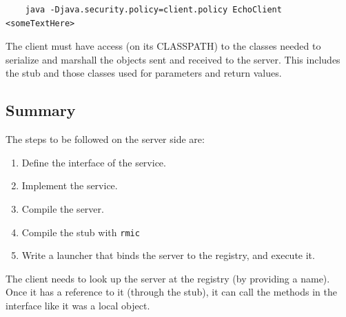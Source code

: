 \begin{verbatim}
    java -Djava.security.policy=client.policy EchoClient <someTextHere>
\end{verbatim}

The client must have access (on its CLASSPATH) to the classes needed
to serialize and marshall the objects sent and received to the
server. This includes the stub and those classes used for parameters
and return values. 

\subsection{Summary}
\label{sec:summary}

The steps to be followed on the server side are: 

\begin{enumerate}
\item Define the interface of the service.
\item Implement the service.
\item Compile the server.
\item Compile the stub with \verb+rmic+
\item Write a launcher that binds the server to the registry, and
  execute it. 
\end{enumerate}

The client needs to look up the server at the registry (by providing a
name). Once it has a reference to it (through the stub), it can call
the methods in the interface like it was a local object. 

